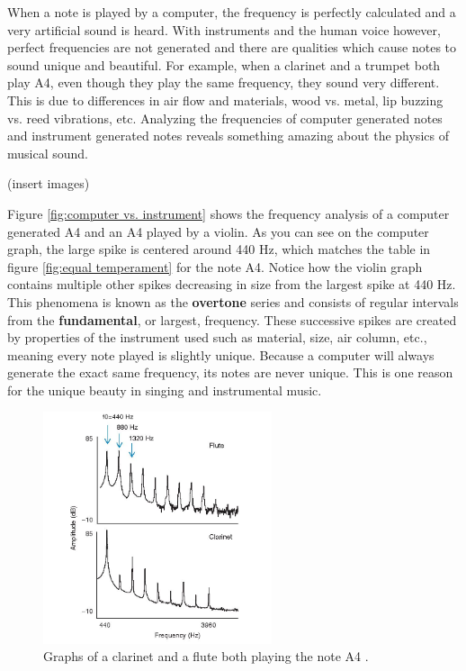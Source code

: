\documentclass[10pt]{article}
\begin{document}
When a note is played by a computer, the frequency is perfectly calculated and a very artificial sound is heard. With instruments and the human voice however, perfect frequencies are not generated and there are qualities which cause notes to sound unique and beautiful. For example, when a clarinet and a trumpet both play A4, even though they play the same frequency, they sound very different. This is due to differences in air flow and materials, wood vs. metal, lip buzzing vs. reed vibrations, etc. Analyzing the frequencies of computer generated notes and instrument generated notes reveals something amazing about the physics of musical sound.

\vspace{1cm}(insert images)\vspace{1cm}

Figure \ref{fig:computer vs. instrument} shows the frequency analysis of a computer generated A4 and an A4 played by a violin. As you can see on the computer graph, the large spike is centered around 440 Hz, which matches the table in figure \ref{fig:equal temperament} for the note A4. Notice how the violin graph contains multiple other spikes decreasing in size from the largest spike at 440 Hz. This phenomena is known as the \textbf{overtone} series and consists of regular intervals from the \textbf{fundamental}, or largest, frequency. These successive spikes are created by properties of the instrument used such as material, size, air column, etc., meaning every note played is slightly unique. Because a computer will always generate the exact same frequency, its notes are never unique. This is one reason for the unique beauty in singing and instrumental music.

\begin{figure}[H]
    \centering
    \includegraphics[width=0.6\textwidth]{FluteClarinetFrequencySpectrum.jpg}
    \caption{Graphs of a clarinet and a flute both playing the note A4 \cite{}.} 
    \label{fig:clarinet vs. flute}
\end{figure}
\end{document}
